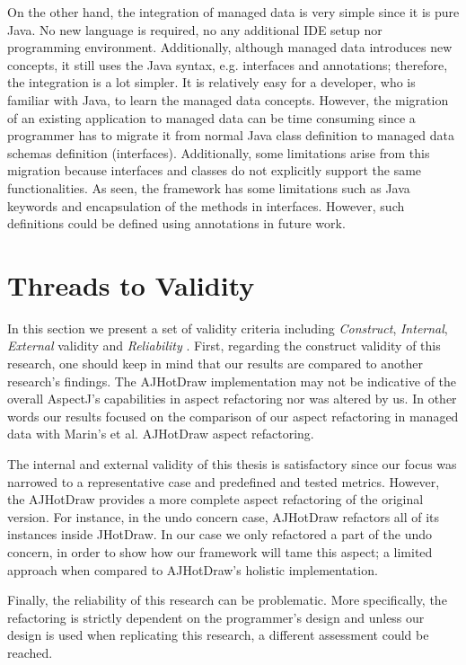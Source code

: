 On the other hand, the integration of managed data is very simple since it is pure Java.
No new language is required, no any additional IDE setup nor programming environment.
Additionally, although managed data introduces new concepts, it still uses the Java syntax, e.g. interfaces and annotations; therefore, the integration is a lot simpler.
It is relatively easy for a developer, who is familiar with Java, to learn the managed data concepts.
However, the migration of an existing application to managed data can be time consuming since a programmer has to migrate it from normal Java class definition  to managed data schemas definition (interfaces).
Additionally, some limitations arise from this migration because interfaces and classes do not explicitly support the same functionalities.
As seen, the framework has some limitations such as Java keywords and encapsulation of the methods in interfaces.
However, such definitions could be defined using annotations in future work.

\section{Threads to Validity}
In this section we present a set of validity criteria including \textit{Construct}, \textit{Internal}, \textit{External} validity and \textit{Reliability} \cite{easterbrook2008selecting}.
First, regarding the construct validity of this research, one should keep in mind that our results are compared to another research's findings. 
The AJHotDraw implementation may not be indicative of the overall AspectJ's capabilities in aspect refactoring nor was altered by us.
In other words our results focused on the comparison of our aspect refactoring in managed data with Marin's et al. AJHotDraw aspect refactoring.

The internal and external validity of this thesis is satisfactory since our focus was narrowed to a representative case and predefined and tested metrics.
However, the AJHotDraw provides a more complete aspect refactoring of the original version.
For instance, in the undo concern case, AJHotDraw refactors all of its instances inside JHotDraw. 
In our case we only refactored a part of the undo concern, in order to show how our framework will tame this aspect; a limited approach when compared to AJHotDraw's holistic implementation.

Finally, the reliability of this research can be problematic.
More specifically, the refactoring is strictly dependent on the programmer's design and unless our design is used when replicating this research, a different assessment could be reached.

